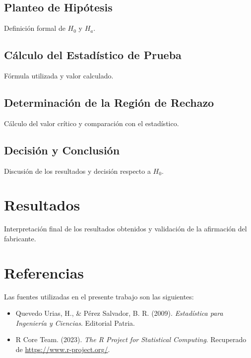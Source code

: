 \documentclass[a4paper,12pt]{article}
\begin{document}
\subsection{Planteo de Hipótesis}
Definición formal de \( H_0 \) y \( H_a \).
\subsection{Cálculo del Estadístico de Prueba}
Fórmula utilizada y valor calculado.
\subsection{Determinación de la Región de Rechazo}
Cálculo del valor crítico y comparación con el estadístico.
\subsection{Decisión y Conclusión}
Discusión de los resultados y decisión respecto a \( H_0 \).

\section{Resultados}
Interpretación final de los resultados obtenidos y validación de la afirmación del fabricante.

\section{Referencias}

Las fuentes utilizadas en el presente trabajo son las siguientes:

\begin{itemize}
    \item Quevedo Urias, H., \& Pérez Salvador, B. R. (2009). \textit{Estadística para Ingeniería y Ciencias}. Editorial Patria.
    \item R Core Team. (2023). \textit{The R Project for Statistical Computing}. Recuperado de \url{https://www.r-project.org/}.
\end{itemize}

\printbibliography
\end{document}
